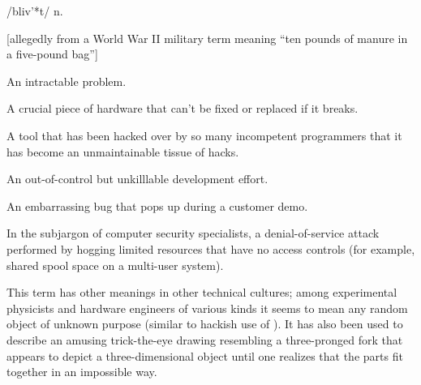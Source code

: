  /bliv'*t/ n.

[allegedly from a World War II military term meaning ``ten pounds of manure in a
five-pound bag'']
\begin{inparaenum}
\item An intractable problem.
\item A crucial piece of hardware that can't be fixed or replaced if it breaks.
\item A tool that has been hacked over by so many incompetent programmers that
    it has become an unmaintainable tissue of hacks.
\item An out-of-control but unkilllable development effort.
\item An embarrassing bug that pops up during a customer demo.
\item In the subjargon of computer security specialists, a denial-of-service
    attack performed by hogging limited resources that have no access controls
    (for example, shared spool space on a multi-user system).
\end{inparaenum}

This term has other meanings in other technical cultures; among experimental
physicists and hardware engineers of various kinds it seems to mean any random
object of unknown purpose (similar to hackish use of ). It has
also been used to describe an amusing trick-the-eye drawing resembling a
three-pronged fork that appears to depict a three-dimensional object until one
realizes that the parts fit together in an impossible way.

